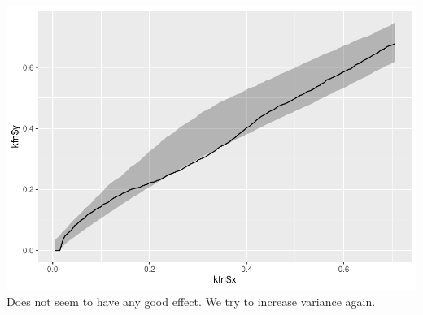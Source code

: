 \documentclass[
]{article}
\begin{document}
\includegraphics{project2_files/figure-latex/unnamed-chunk-15-1.pdf}
Does not seem to have any good effect. We try to increase variance
again.
\end{document}
